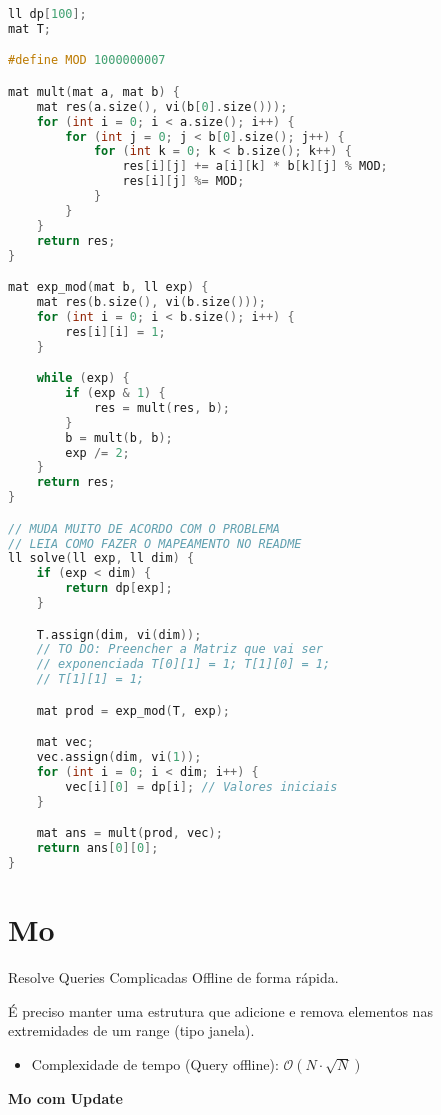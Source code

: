 \documentclass[10pt, a4paper, oneside]{book}
\begin{document}
\begin{lstlisting}[language=C++]
ll dp[100];
mat T;

#define MOD 1000000007

mat mult(mat a, mat b) {
    mat res(a.size(), vi(b[0].size()));
    for (int i = 0; i < a.size(); i++) {
        for (int j = 0; j < b[0].size(); j++) {
            for (int k = 0; k < b.size(); k++) {
                res[i][j] += a[i][k] * b[k][j] % MOD;
                res[i][j] %= MOD;
            }
        }
    }
    return res;
}

mat exp_mod(mat b, ll exp) {
    mat res(b.size(), vi(b.size()));
    for (int i = 0; i < b.size(); i++) {
        res[i][i] = 1;
    }

    while (exp) {
        if (exp & 1) {
            res = mult(res, b);
        }
        b = mult(b, b);
        exp /= 2;
    }
    return res;
}

// MUDA MUITO DE ACORDO COM O PROBLEMA
// LEIA COMO FAZER O MAPEAMENTO NO README
ll solve(ll exp, ll dim) {
    if (exp < dim) {
        return dp[exp];
    }

    T.assign(dim, vi(dim));
    // TO DO: Preencher a Matriz que vai ser
    // exponenciada T[0][1] = 1; T[1][0] = 1;
    // T[1][1] = 1;

    mat prod = exp_mod(T, exp);

    mat vec;
    vec.assign(dim, vi(1));
    for (int i = 0; i < dim; i++) {
        vec[i][0] = dp[i]; // Valores iniciais
    }

    mat ans = mult(prod, vec);
    return ans[0][0];
}
\end{lstlisting}
\hfill

\section{Mo}


Resolve Queries Complicadas Offline de forma rápida.  



É preciso manter uma estrutura que adicione e remova elementos nas extremidades de um range (tipo janela).



\begin{itemize}
\item Complexidade de tempo (Query offline): $\mathcal{O}(N \cdot \sqrt{N})$
\end{itemize}



\textbf{Mo com Update} 
\end{document}
